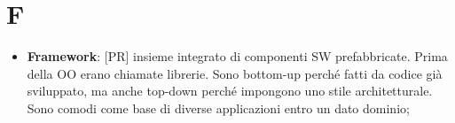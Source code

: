 % 
%
% 
%

\section{F}
	\begin{itemize}
		\item \textbf{Framework}: [PR] insieme integrato di componenti SW prefabbricate. Prima della OO erano chiamate librerie. Sono bottom-up perché fatti da codice già sviluppato, ma anche top-down perché impongono uno stile architetturale. Sono comodi come base di diverse applicazioni entro un dato dominio;

	\end{itemize}
